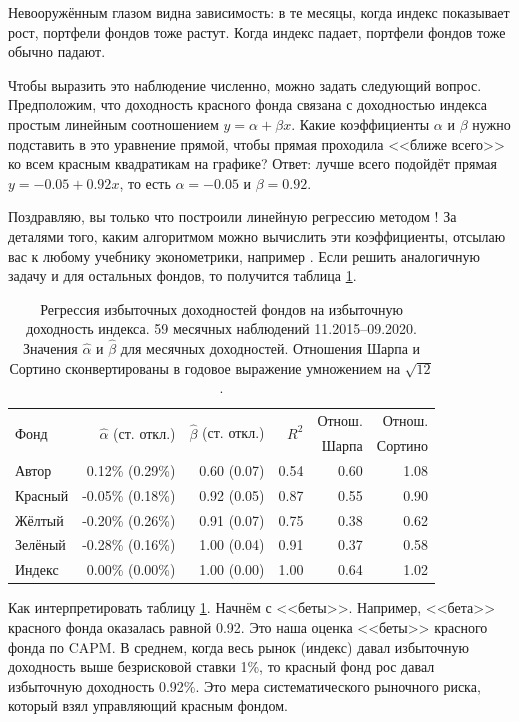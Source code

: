 Невооружённым глазом видна зависимость: в те месяцы, когда индекс показывает рост, портфели фондов тоже растут. Когда индекс падает, портфели фондов тоже обычно падают.

Чтобы выразить это наблюдение численно, можно задать следующий вопрос. Предположим, что доходность красного фонда связана с доходностью индекса простым линейным соотношением $y = \alpha + \beta x$. Какие коэффициенты $\alpha$ и $\beta$ нужно подставить в это уравнение прямой, чтобы прямая проходила <<ближе всего>> ко всем красным квадратикам на графике? Ответ: лучше всего подойдёт прямая $y = -0.05 + 0.92x$, то есть $\alpha = -0.05$ и $\beta=0.92$.

Поздравляю, вы только что построили линейную регрессию методом ! За деталями того, каким алгоритмом можно вычислить эти коэффициенты, отсылаю вас к любому учебнику эконометрики, например \cite[ch.~2]{verbeek2012guide}. Если решить аналогичную задачу и для остальных фондов, то получится таблица \ref{capm_regression_results}.

\begin{table}[h]
\centering
\begin{tabular}{l|r|r|r|r|r}
\multirow{2}{*}{Фонд} & 
\multirow{2}{*}{$\hat{\alpha}$ (ст. откл.)} &
\multirow{2}{*}{$\hat{\beta}$ (ст. откл.)}  &
\multirow{2}{*}{$R^2$} &
Отнош.&
Отнош. \\
& & & & Шарпа & Сортино \\ \hline
Автор   &  0.12\% (0.29\%) & 0.60 (0.07) & 0.54 & 0.60 & 1.08 \\
Красный & -0.05\% (0.18\%) & 0.92 (0.05) & 0.87 & 0.55 & 0.90 \\
Жёлтый  & -0.20\% (0.26\%) & 0.91 (0.07) & 0.75 & 0.38 & 0.62 \\
Зелёный & -0.28\% (0.16\%) & 1.00 (0.04) & 0.91 & 0.37 & 0.58 \\ \hline
Индекс  &  0.00\% (0.00\%) & 1.00 (0.00) & 1.00 & 0.64 & 1.02
\end{tabular}
\caption{Регрессия избыточных доходностей фондов на избыточную доходность индекса. 59 месячных наблюдений 11.2015--09.2020. Значения $\hat{\alpha}$ и $\hat{\beta}$ для месячных доходностей. Отношения Шарпа и Сортино сконвертированы в годовое выражение умножением на $\sqrt{12}$.}
\label{capm_regression_results}
\end{table}

Как интерпретировать таблицу \ref{capm_regression_results}. Начнём с <<беты>>. Например, <<бета>> красного фонда оказалась равной 0.92. Это наша оценка <<беты>> красного фонда по CAPM. В среднем, когда весь рынок (индекс) давал избыточную доходность выше безрисковой ставки 1\%, то красный фонд рос давал избыточную доходность 0.92\%. Это мера систематического рыночного риска, который взял управляющий красным фондом.

